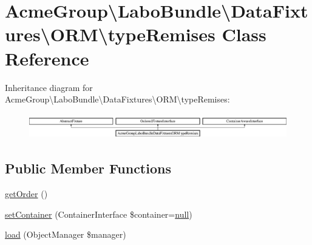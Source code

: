 \hypertarget{class_acme_group_1_1_labo_bundle_1_1_data_fixtures_1_1_o_r_m_1_1type_remises}{\section{Acme\+Group\textbackslash{}Labo\+Bundle\textbackslash{}Data\+Fixtures\textbackslash{}O\+R\+M\textbackslash{}type\+Remises Class Reference}
\label{class_acme_group_1_1_labo_bundle_1_1_data_fixtures_1_1_o_r_m_1_1type_remises}
}
Inheritance diagram for Acme\+Group\textbackslash{}Labo\+Bundle\textbackslash{}Data\+Fixtures\textbackslash{}O\+R\+M\textbackslash{}type\+Remises\+:\begin{figure}[H]
\begin{center}
\leavevmode
\includegraphics[height=1.098039cm]{class_acme_group_1_1_labo_bundle_1_1_data_fixtures_1_1_o_r_m_1_1type_remises}
\end{center}
\end{figure}
\subsection*{Public Member Functions}
\begin{DoxyCompactItemize}
\item 
\hyperlink{class_acme_group_1_1_labo_bundle_1_1_data_fixtures_1_1_o_r_m_1_1type_remises_ada86891009076082a5fdff18df6bc481}{get\+Order} ()
\item 
\hyperlink{class_acme_group_1_1_labo_bundle_1_1_data_fixtures_1_1_o_r_m_1_1type_remises_a317ac2666b44c054c067adbc2f93e474}{set\+Container} (Container\+Interface \$container=\hyperlink{validate_8js_afb8e110345c45e74478894341ab6b28e}{null})
\item 
\hyperlink{class_acme_group_1_1_labo_bundle_1_1_data_fixtures_1_1_o_r_m_1_1type_remises_a0e96fcf6f1f736c13e7ec7161d1618ff}{load} (Object\+Manager \$manager)
\end{DoxyCompactItemize}


